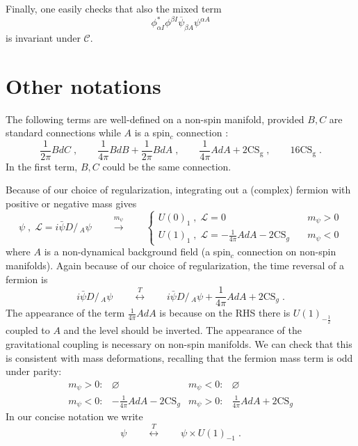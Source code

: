 \documentclass[a4paper, 12pt]{article}
\newcommand{\wb}{\overline}
\numberwithin{equation}{section}
\newcommand{\Dslash}{D\!\!\!\!\slash\,}
\newcommand{\be}{\begin{equation}} \newcommand{\ee}{\end{equation}}
\newcommand{\cC}{\mathcal{C}}
\newcommand{\cL}{\mathcal{L}}
\begin{document}
Finally, one easily checks that also the mixed term
\be
\phi_{\alpha I}^* \phi^{\beta I} \wb\psi_{\beta A} \psi^{\alpha A}
\ee
is invariant under $\cC$.





\section{Other notations}
\label{app: spinc}

The following terms are well-defined on a non-spin manifold, provided $B,C$ are standard connections while $A$ is a spin$_c$ connection \cite{Seiberg:2016rsg}:
\be
\frac1{2\pi} BdC \;,\qquad \frac1{4\pi} BdB + \frac1{2\pi} BdA \;,\qquad \frac1{4\pi} AdA + 2 \text{CS}_\text{g} \;,\qquad 16 \text{CS}_\text{g} \;.
\ee
In the first term, $B,C$ could be the same connection.

Because of our choice of regularization, integrating out a (complex) fermion with positive or negative mass gives
\be
\psi \;,\; \cL = i \bar\psi \Dslash_A \psi \qquad \stackrel{m_\psi}{\longrightarrow}\qquad \begin{cases} U(0)_1 \;,\; \cL=0 & m_\psi > 0 \\ U(1)_1 \;,\; \cL = - \frac1{4\pi} AdA - 2\text{CS}_g \quad & m_\psi<0 \end{cases}
\ee
where $A$ is a non-dynamical background field (a spin$_c$ connection on non-spin manifolds). Again because of our choice of regularization, the time reversal of a fermion is
\be
i \bar\psi \Dslash_A \psi \qquad\stackrel{T}{\longleftrightarrow}\qquad i \bar\psi \Dslash_A \psi + \frac1{4\pi} AdA + 2 \text{CS}_g \;.
\ee
The appearance of the term $\frac1{4\pi} AdA$ is because on the RHS there is $U(1)_{-\frac12}$ coupled to $A$ and the level should be inverted. The appearance of the gravitational coupling is necessary on non-spin manifolds. We can check that this is consistent with mass deformations, recalling that the fermion mass term is odd under parity:
\be
\begin{array}{rc|rc}
m_\psi>0: & \varnothing & m_\psi<0: & \varnothing \\
m_\psi<0: & - \frac1{4\pi} AdA - 2 \text{CS}_g & m_\psi>0: & \frac1{4\pi} AdA + 2\text{CS}_g
\end{array}
\ee
In our concise notation we write
\be
\psi \qquad\stackrel{T}{\longleftrightarrow}\qquad \psi \times U(1)_{-1} \;.
\ee













\end{document}
